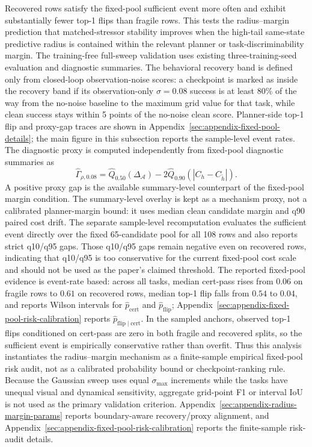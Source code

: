 \documentclass[10pt]{article}
\newcommand{\stdmax}{\ensuremath{\sigma_{\max}}}
\begin{document}
Recovered rows satisfy the fixed-pool sufficient event more often and exhibit substantially fewer top-1 flips than fragile rows. This tests the radius--margin prediction that matched-stressor stability improves when the high-tail same-state predictive radius is contained within the relevant planner or task-discriminability margin. The training-free full-sweep validation uses existing three-training-seed evaluation and diagnostic summaries. The behavioral recovery band is defined only from closed-loop observation-noise scores: a checkpoint is marked as inside the recovery band if its observation-only $\sigma=0.08$ success is at least 80\% of the way from the no-noise baseline to the maximum grid value for that task, while clean success stays within 5 points of the no-noise clean score. Planner-side top-1 flip and proxy-gap traces are shown in Appendix~\ref{sec:appendix-fixed-pool-details}; the main figure in this subsection reports the sample-level event rates. The diagnostic proxy is computed independently from fixed-pool diagnostic summaries as
\[
\widehat\Gamma_{\rho,0.08}
=\widehat Q_{0.50}(\Delta_{\mathcal A})
-2\widehat Q_{0.90}(|C_h-C_{\tilde h}|).
\]
A positive proxy gap is the available summary-level counterpart of the fixed-pool margin condition. The summary-level overlay is kept as a mechanism proxy, not a calibrated planner-margin bound: it uses median clean candidate margin and q90 paired cost drift. The separate sample-level recomputation evaluates the sufficient event directly over the fixed 65-candidate pool for all 108 rows and also reports strict q10/q95 gaps. Those q10/q95 gaps remain negative even on recovered rows, indicating that q10/q95 is too conservative for the current fixed-pool cost scale and should not be used as the paper's claimed threshold. The reported fixed-pool evidence is event-rate based: across all tasks, median cert-pass rises from $0.06$ on fragile rows to $0.61$ on recovered rows, median top-1 flip falls from $0.54$ to $0.04$, and  reports Wilson intervals for $\hat p_{\mathrm{cert}}$ and $\hat p_{\mathrm{flip}}$; Appendix~\ref{sec:appendix-fixed-pool-risk-calibration} reports $\hat p_{\mathrm{flip}\mid\mathrm{cert}}$. In the sampled anchors, observed top-1 flips conditioned on cert-pass are zero in both fragile and recovered splits, so the sufficient event is empirically conservative rather than overfit. Thus this analysis instantiates the radius--margin mechanism as a finite-sample empirical fixed-pool risk audit, not as a calibrated probability bound or checkpoint-ranking rule. Because the Gaussian sweep uses equal $\stdmax{}$ increments while the tasks have unequal visual and dynamical sensitivity, aggregate grid-point F1 or interval IoU is not used as the primary validation criterion. Appendix~\ref{sec:appendix-radius-margin-params} reports boundary-aware recovery/proxy alignment, and Appendix~\ref{sec:appendix-fixed-pool-risk-calibration} reports the finite-sample risk-audit details.
\end{document}

